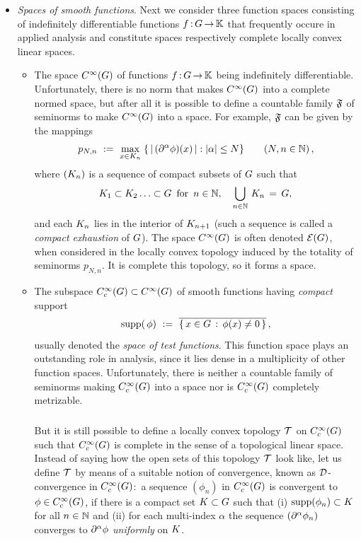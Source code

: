 \documentclass[11pt,twoside]{article}
\begin{document}
\begin{itemize}[leftmargin=15pt,itemsep=6pt]
\subparagraph*{}
If $\G$ is a bounded domain, then we have for $0 < \alpha < \beta \leq 1$
\[
C^1(\clG) \subsetneq
C^{0,\beta}(\clG) \subsetneq
C^{0,\alpha}(\clG) \subsetneq
C(\clG).
\]

\item[4.] \textit{Spaces of smooth functions}.
Next we consider three function spaces
consisting of indefinitely differentiable functions $f{\,:\,}G {\,\to\,} {\mathbb{K}}$
that frequently occure in applied analysis
and constitute {\FRECHET} spaces respectively
complete locally convex linear spaces.

\begin{itemize}[leftmargin=20pt]
\item[(a)]
The space $C^{\infty}(G)$ of functions $f{\,:\,}G {\,\to\,} {\mathbb{K}}$ being indefinitely differentiable.
Unfortunately,
there is no norm that makes $C^{\infty}(G)$ into a complete normed space,
but after all it is possible to define a countable family $\mathfrak{F}$
of seminorms to make $C^{\infty}(G)$ into a {\FRECHET} space.
For example,
$\mathfrak{F}$ can be given by the mappings
\[
p_{N,n} \, \eqdef \,
\max_{x \in \compK_n} \;
\{ \, \abs{\, (\PA \phi)(x) \,} : \abs{\alpha} \leq N \}
\quad \quad (N,n \in \N)\,,
\]
where $({K}_n)$ is a sequence of compact subsets of $\G$
such that
\[
{K}_1 \subset {K}_2 \ldots \subset G \, \mbox{ for } \, n \in {\mathbb{N}},
\quad
\bigcup_{n \in {\mathbb{N}}} \, {K}_n \,=\, G,
\]
and each ${K}_n$ lies in the interior of ${K}_{n+1}$
(such a sequence is called a \textit{compact exhaustion} of $\G$).
The space $C^{\infty}(G)$ is often denoted ${\mathcal{E}}(G)$,
when considered in the locally convex topology induced by the totality
of seminorms $p_{N,n}$.
It is complete {\wrt} this topology,
so it forms a {\FRECHET} space.

\item[(b)]
The subspace $C_c^{\infty}(G) \subset C^{\infty}(G)$ of smooth functions
having \textit{compact} support
\[
\operatorname{supp}(\,\phi) \, \,:=\, \, \overline{\{ \, x \in G \,: \, \phi(x) \neq 0 \, \}}\,,
\]
usually denoted the \textit{space of test functions}.
This function space plays an outstanding role in analysis,
since it lies dense in a multiplicity of other function spaces.
Unfortunately,
there is neither a countable family of seminorms
making $C_c^{\infty}(G)$ into a {\FRECHET} space nor is $C_c^{\infty}(G)$ completely metrizable.

\subparagraph*{}
But it is still possible to define a locally convex topology $\mathcal{T}$ on $C_c^{\infty}(G)$
such that $C_c^{\infty}(G)$ is complete in the sense of a topological linear space.
Instead of saying how the open sets of this topology $\mathcal{T}$ look like,
let us define $\mathcal{T}$ by means of a suitable notion of convergence,
known as ${\mathcal{D}}$-convergence in $C_c^{\infty}(G)$:\,
a sequence $(\phi_n)$ in $C_c^{\infty}(G)$ is convergent to $\phi \in C_c^{\infty}(G)$,
if there is a compact set ${K} \subset G$
such that
(i)  $\operatorname{supp}(\phi_n) \subset {K}$ for all $n \in {\mathbb{N}}$ and
(ii) for each multi-index $\alpha$ the sequence $(\partial^{\alpha} \phi_n)$
     converges to $\partial^{\alpha} \phi$ \textit{uniformly} on ${K}$.


\end{itemize}
\end{itemize}
\end{document}
